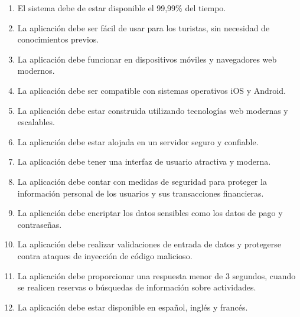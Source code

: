 \begin{enumerate}[label=\bfseries{RNF \arabic*.},leftmargin=*]
	\item El sistema debe de estar disponible el 99,99\% del tiempo.
	\item La aplicación debe ser fácil de usar para los turistas, sin necesidad de conocimientos previos.
	\item La aplicación debe funcionar en dispositivos móviles y navegadores web modernos.
	\item La aplicación debe ser compatible con sistemas operativos iOS y Android.
	\item La aplicación debe estar construida utilizando tecnologías web modernas y escalables.
	\item La aplicación debe estar alojada en un servidor seguro y confiable.
	\item La aplicación debe tener una interfaz de usuario atractiva y moderna.
	\item La aplicación debe contar con medidas de seguridad para proteger la información personal de los usuarios y sus transacciones financieras.
	\item La aplicación debe encriptar los datos sensibles como los datos de pago y contraseñas.
	\item La aplicación debe realizar validaciones de entrada de datos y protegerse contra ataques de inyección de código malicioso.
	\item La aplicación debe proporcionar una respuesta menor de 3 segundos, cuando se realicen reservas o búsquedas de información sobre actividades.
	\item La aplicación debe estar disponible en español, inglés y francés.
\end{enumerate}
